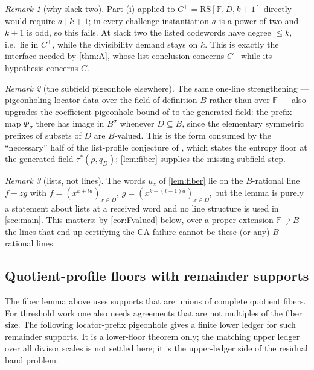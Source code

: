 \documentclass[11pt]{article}
\theoremstyle{definition}
\theoremstyle{remark}
\newtheorem{remark}[remark]{Remark}
\newcommand{\F}{\mathbb{F}}
\newcommand{\B}{B}
\newcommand{\RS}{\mathrm{RS}}
\begin{document}
\begin{remark}[why slack two]\label{rem:slacktwo}
Part (i) applied to $C^+=\RS[\F,D,k+1]$ directly would require $a\mid k+1$; in every challenge instantiation $a$ is a power of two and $k+1$ is odd, so this fails. At slack two the listed codewords have degree $\le k$, i.e.\ lie in $C^+$, while the divisibility demand stays on $k$. This is exactly the interface needed by \cref{thm:A}, whose list conclusion concerns $C^+$ while its hypothesis concerns $C$.
\end{remark}

\begin{remark}[the subfield pigeonhole elsewhere]\label{rem:subpigeon}
The same one-line strengthening --- pigeonholing locator data over the field of definition $\B$ rather than over $\F$ --- also upgrades the coefficient-pigeonhole bound of \cite{Cho26b} to the generated field: the prefix map $\Phi_\sigma$ there has image in $\B^\sigma$ whenever $D\subseteq\B$, since the elementary symmetric prefixes of subsets of $D$ are $\B$-valued. This is the form consumed by the ``necessary'' half of the list-profile conjecture of \cite{Cho26b}, which states the entropy floor at the generated field $\tau^{*}(\rho,q_D)$; \cref{lem:fiber} supplies the missing subfield step.
\end{remark}

\begin{remark}[lists, not lines]\label{rem:lines}
The words $u_z$ of \cref{lem:fiber} lie on the $\B$-rational line $f+zg$ with $f=(x^{k+ta})_{x\in D}$, $g=(x^{k+(t-1)a})_{x\in D}$, but the lemma is purely a statement about lists at a received word and no line structure is used in \cref{sec:main}. This matters: by \cref{cor:Fvalued} below, over a proper extension $\F\supsetneq\B$ the lines that end up certifying the CA failure cannot be these (or any) $\B$-rational lines.
\end{remark}

\subsection{Quotient-profile floors with remainder supports}
\label{sec:quotient-remainder}

The fiber lemma above uses supports that are unions of complete quotient fibers.
For threshold work one also needs agreements that are not multiples of the fiber
size.  The following locator-prefix pigeonhole gives a finite lower ledger for
such remainder supports.  It is a lower-floor theorem only; the matching upper
ledger over all divisor scales is not settled here; it is the upper-ledger side of the residual band problem.
\end{document}
